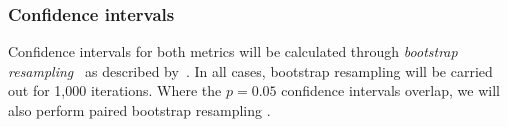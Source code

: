 \documentclass[11pt]{article}
\newcommand{\comment}[1]{\todo{#1}}
\begin{document}

%

\subsubsection{Confidence intervals}
Confidence intervals for both metrics will be calculated through 
\emph{bootstrap resampling}~\citep{efron94} as described
by~\citet{koehn04}. %
In all cases, bootstrap resampling will
be carried out for 1,000 iterations. Where the $p = 0.05$ confidence
intervals overlap, we will also perform paired bootstrap resampling
\citep{koehn04}.
\end{document}
